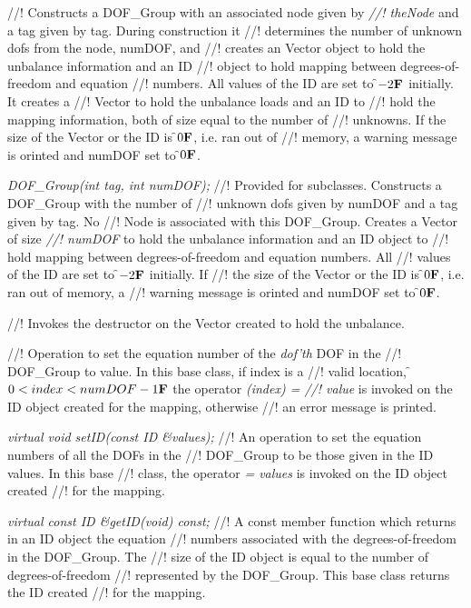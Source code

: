 //! Constructs a  DOF\_Group with an associated node given by {\em
//! theNode} and a tag given by \p tag. During construction it
//! determines the number of unknown dofs from the node, \p numDOF, and
//! creates an Vector object to hold the unbalance information and an ID
//! object to hold mapping between degrees-of-freedom and equation
//! numbers. All values of the ID are set to \f$-2{\bf F}$ initially. It creates a
//! Vector to hold the unbalance loads and an ID to 
//! hold the mapping information, both of size equal to the number of
//! unknowns. If the size of the Vector or the ID is \f$0{\bf F}$, i.e. ran out of
//! memory, a warning message is orinted and \p numDOF set to \f$0{\bf F}$.

{\em DOF\_Group(int tag, int numDOF);}
//! Provided for subclasses. Constructs a  DOF\_Group with the number of
//! unknown dofs given by \p numDOF and a tag given by \p tag. No
//! Node is associated with this DOF\_Group. Creates a Vector of size {\em
//! numDOF} to hold the unbalance information and an ID object to
//! hold mapping between degrees-of-freedom and equation numbers. All
//! values of the ID are set to \f$-2{\bf F}$ initially. If
//! the size of the Vector or the ID is \f$0{\bf F}$, i.e. ran out of memory, a
//! warning message is orinted and \p numDOF set to \f$0{\bf F}$.

//! Invokes the destructor on the Vector created to hold the unbalance.

//! Operation to set the equation number of the {\em dof'th} DOF in the
//! DOF\_Group to \p value. In this base class, if \p index is a
//! valid location, \f$0 < index < numDOF-1{\bf F}$ the operator {\em (index) =
//! value} is invoked on the ID object created for the mapping, otherwise
//! an error message is printed. 


{\em virtual void setID(const ID \&values);}
//! An operation to set the equation numbers of all the DOFs in the
//! DOF\_Group to be those given in the ID \p values. In this base
//! class, the operator {\em = values} is invoked on the ID object created
//! for the mapping. 

{\em virtual const ID \&getID(void) const;}
//! A const member function which returns in an ID object the equation
//! numbers associated with the degrees-of-freedom in the DOF\_Group. The
//! size of the ID object is equal to the number of degrees-of-freedom
//! represented by the DOF\_Group. This base class returns the ID created
//! for the mapping. 

